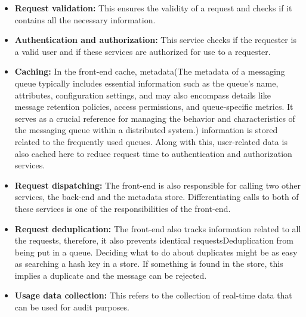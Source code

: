 \begin{itemize}
\item
\protect{}\label{OWNXV9zV2_TXwdaFSQP5b}
\textbf{Request validation:} This ensures the validity of a request and checks if it contains all the necessary information.
\item
\protect{}\label{ae0lLGsCZRjB1O_ZdICz4}
\textbf{Authentication and authorization:} This service checks if the requester is a valid user and if these services are authorized for use to a requester.
\item
\protect{}\label{PPlWWSTjiF7SpxYt_JCga}
\textbf{Caching:} In the front-end cache, metadata(The metadata of a messaging queue typically includes essential information such as the queue's name, attributes, configuration settings, and may also encompass details like message retention policies, access permissions, and queue-specific metrics. It serves as a crucial reference for managing the behavior and characteristics of the messaging queue within a distributed system.) information is stored related to the frequently used queues. Along with this, user-related data is also cached here to reduce request time to authentication and authorization services.
\item
\protect{}\label{xYmTNWypilnf9Gb1_edwl}
\textbf{Request dispatching:} The front-end is also responsible for calling two other services, the back-end and the metadata store. Differentiating calls to both of these services is one of the responsibilities of the front-end.
\item
\protect{}\label{eZcs8UJ5B4_44OI_0_8j4}
\textbf{Request deduplication:} The front-end also tracks information related to all the requests, therefore, it also prevents identical requestsDeduplication from being put in a queue. Deciding what to do about duplicates might be as easy as searching a hash key in a store. If something is found in the store, this implies a duplicate and the message can be rejected.
\item
\protect{}\label{553-1lp9hz6VB6O3OW2vw}
\textbf{Usage data collection:} This refers to the collection of real-time data that can be used for audit purposes.
\end{itemize}
\\
